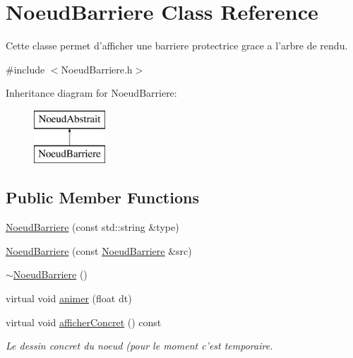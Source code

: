 \hypertarget{class_noeud_barriere}{\section{Noeud\-Barriere Class Reference}
\label{class_noeud_barriere}
}


Cette classe permet d'afficher une barriere protectrice grace a l'arbre de rendu.  




{\ttfamily \#include $<$Noeud\-Barriere.\-h$>$}

Inheritance diagram for Noeud\-Barriere\-:\begin{figure}[H]
\begin{center}
\leavevmode
\includegraphics[height=2.000000cm]{class_noeud_barriere}
\end{center}
\end{figure}
\subsection*{Public Member Functions}
\begin{DoxyCompactItemize}
\item 
\hyperlink{class_noeud_barriere_ac2ded5cbd09486327739b9a1eff2a88f}{Noeud\-Barriere} (const std\-::string \&type)
\item 
\hyperlink{class_noeud_barriere_a0f9e6ae182c7eb58fcadfd96f16adc40}{Noeud\-Barriere} (const \hyperlink{class_noeud_barriere}{Noeud\-Barriere} \&src)
\item 
\hyperlink{class_noeud_barriere_a1a1b0a7ae1c14dcbcac0f6a2a1660ce1}{$\sim$\-Noeud\-Barriere} ()
\item 
virtual void \hyperlink{class_noeud_barriere_a5abfc301214b16756cc0bebc6422660a}{animer} (float dt)
\item 
\hypertarget{class_noeud_barriere_a7a8838b9f73166d2548cfff11a0386b7}{virtual void \hyperlink{class_noeud_barriere_a7a8838b9f73166d2548cfff11a0386b7}{afficher\-Concret} () const }\label{class_noeud_barriere_a7a8838b9f73166d2548cfff11a0386b7}

\begin{DoxyCompactList}\small\item\em Le dessin concret du noeud (pour le moment c'est temporaire. \end{DoxyCompactList}\end{DoxyCompactItemize}
